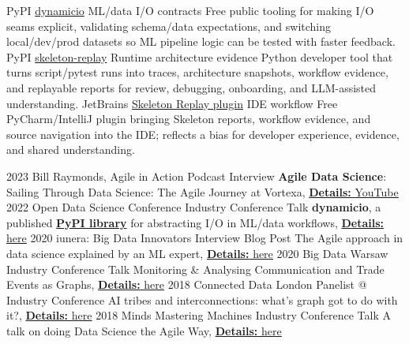 \documentclass[]{../../../../friggeri-cv}
\begin{document}
\begin{entrylist2}
	\entrytwo
		{\small PyPI}
		{\small \href{https://pypi.org/project/dynamicio/}{dynamicio}}
		{\small ML/data I/O contracts}
		{\footnotesize Free public tooling for making I/O seams explicit, validating schema/data expectations, and switching local/dev/prod datasets so ML pipeline logic can be tested with faster feedback.}
	\entrytwo
		{\small PyPI}
		{\small \href{https://pypi.org/project/skeleton-replay/}{skeleton-replay}}
		{\small Runtime architecture evidence}
		{\footnotesize Python developer tool that turns script/pytest runs into traces, architecture snapshots, workflow evidence, and replayable reports for review, debugging, onboarding, and LLM-assisted understanding.}
	\entrytwo
		{\small JetBrains}
		{\small \href{https://plugins.jetbrains.com/plugin/32807-skeleton-replay}{Skeleton Replay plugin}}
		{\small IDE workflow}
		{\footnotesize Free PyCharm/IntelliJ plugin bringing Skeleton reports, workflow evidence, and source navigation into the IDE; reflects a bias for developer experience, evidence, and shared understanding.}
\end{entrylist2}
\begin{entrylist2}
	\entrytwo
		{\small 2023}
		{\small Bill Raymonds, Agile in Action}
		{\small Podcast Interview}
		{\small \textbf{Agile Data Science}: Sailing Through Data Science: The Agile Journey at Vortexa, \underline{\textbf{Details:} \href{https://christos-hadjinikolis.github.io//2023/10/31/Agile-In-Action.html}{YouTube}}}
	\entrytwo
		{\small 2022}
		{\small Open Data Science Conference}
		{\small Industry Conference Talk}
		{\small \textbf{dynamicio}, a published \href{https://pypi.org/project/dynamicio/}{\textbf{PyPI library}} for abstracting I/O in ML/data workflows, \underline{\textbf{Details:} \href{https://odsc.com/speakers/dynamicio-a-pandas-i-o-wrapper-why-you-should-start-your-ml-ops-journey-with-wrapping-your-i-o/}{here}}}
	\entrytwo
		{\small 2020}
		{\small iunera: Big Data Innovators}
		{\small Interview Blog Post}
		{\small The Agile approach in data science explained by an ML expert, \underline{\textbf{Details:} \href{https://www.iunera.com/kraken/interviews/the-agile-approach-in-data-science-explained-by-an-ml-expert/}{here}}}
	\entrytwo
		{\small 2020}
		{\small Big Data Warsaw}
		{\small Industry Conference Talk}
		{\small Monitoring \& Analysing Communication and Trade Events as Graphs, \underline{\textbf{Details:} \href{https://bigdatatechwarsaw.eu/agenda/}{here}}}
	\entrytwo
		{\small 2018}
		{\small Connected Data London}
		{\small Panelist @ Industry Conference}
		{\small AI tribes and interconnections: what’s graph got to do with it?, \underline{\textbf{Details:} \href{http://connected-data.london/2018/09/23/ai-tribes-and-interconnections-whats-graph-got-to-do-with-it/}{here}}}
	\entrytwo
		{\small 2018}
		{\small Minds Mastering Machines}
		{\small Industry Conference Talk}
		{\small A talk on doing Data Science the Agile Way, \underline{\textbf{Details:} \href{https://2018.mcubed.london/sessions/data-science-agile-way/}{here}}}
\end{entrylist2}
\end{document}
